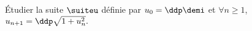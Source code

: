 
\begin{exercice} \;
\'Etudier la suite $\suiteu$ d\'efinie par $u_0=\ddp\demi$ et $\forall n \geq 1$, $u_{n+1}=\ddp\sqrt{1+u_n^2}.$
\end{exercice}